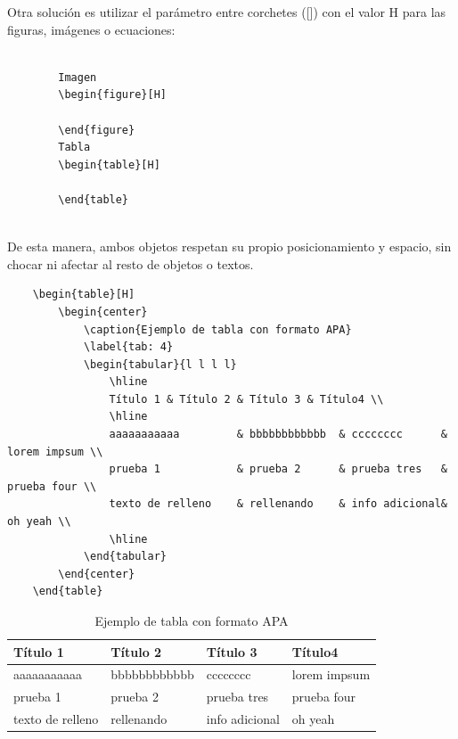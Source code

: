 Otra solución es utilizar el parámetro entre corchetes ([]) con el valor H para las figuras, imágenes o ecuaciones:
\begin{lstlisting}
    
        Imagen
        \begin{figure}[H]
        
        \end{figure}
        Tabla
        \begin{table}[H]
        
        \end{table}
    
\end{lstlisting}

De esta manera, ambos objetos respetan su propio posicionamiento y espacio, sin chocar ni afectar al resto de objetos o textos.
\begin{lstlisting}
    \begin{table}[H]
        \begin{center}
            \caption{Ejemplo de tabla con formato APA}
            \label{tab: 4}
            \begin{tabular}{l l l l}
                \hline
                Título 1 & Título 2 & Título 3 & Título4 \\
                \hline
                aaaaaaaaaaa         & bbbbbbbbbbbb  & cccccccc      & lorem impsum \\
                prueba 1            & prueba 2      & prueba tres   & prueba four \\
                texto de relleno    & rellenando    & info adicional& oh yeah \\
                \hline
            \end{tabular}
        \end{center}
    \end{table}
\end{lstlisting}
\begin{table}[H]
    \begin{center}
        \caption{Ejemplo de tabla con formato APA}
        \label{tab: 4}
        \begin{tabular}{l l l l}
            \hline
            Título 1 & Título 2 & Título 3 & Título4 \\
            \hline
            aaaaaaaaaaa         & bbbbbbbbbbbb  & cccccccc      & lorem impsum \\
            prueba 1            & prueba 2      & prueba tres   & prueba four \\
            texto de relleno    & rellenando    & info adicional& oh yeah \\
            \hline
        \end{tabular}
    \end{center}
\end{table}


